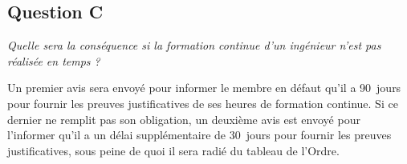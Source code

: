 	\subsection{Question C}
	\emph{Quelle sera la conséquence si la formation continue d’un ingénieur n’est pas réalisée en temps ?}
	
	Un premier avis sera envoyé pour informer le membre en défaut qu’il a 90~jours pour fournir les preuves justificatives de ses heures de formation continue. Si ce dernier ne remplit pas son obligation, un deuxième avis est envoyé pour l’informer qu’il a un délai supplémentaire de 30~jours pour fournir les preuves justificatives, sous peine de quoi il sera radié du tableau de l’Ordre.

	\vfill

	{\centering%
	\par}
	
	\vfill
